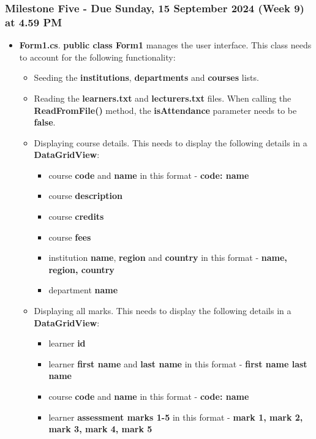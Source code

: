 \documentclass{article}
\begin{document}
\subsubsection*{Milestone Five - Due Sunday, 15 September 2024 (Week 9) at 4.59 PM}

\begin{itemize}
    \item \textbf{Form1.cs}. \textbf{public class Form1} manages the user interface. This class needs to account for the following functionality:
    \begin{itemize}
        \item Seeding the \textbf{institutions}, \textbf{departments} and \textbf{courses} lists.
        \item Reading the \textbf{learners.txt} and \textbf{lecturers.txt} files. When calling the \textbf{ReadFromFile()} method, the \textbf{isAttendance} parameter needs to be \textbf{false}.
        \item Displaying course details. This needs to display the following details in a \textbf{DataGridView}:
        \begin{itemize}
            \item course \textbf{code} and \textbf{name} in this format - \textbf{code: name}
            \item course \textbf{description}
            \item course \textbf{credits}
            \item course \textbf{fees}
            \item institution \textbf{name}, \textbf{region} and \textbf{country} in this format - \textbf{name, region, country}
            \item department \textbf{name}
        \end{itemize}
        \item Displaying all marks. This needs to display the following details in a \textbf{DataGridView}:
        \begin{itemize}
            \item learner \textbf{id}
            \item learner \textbf{first name} and \textbf{last name} in this format - \textbf{first name last name}
            \item course \textbf{code} and \textbf{name} in this format - \textbf{code: name}
            \item learner \textbf{assessment marks 1-5} in this format - \textbf{mark 1, mark 2, mark 3, mark 4, mark 5}

\end{itemize}
\end{itemize}
\end{itemize}
\end{document}
